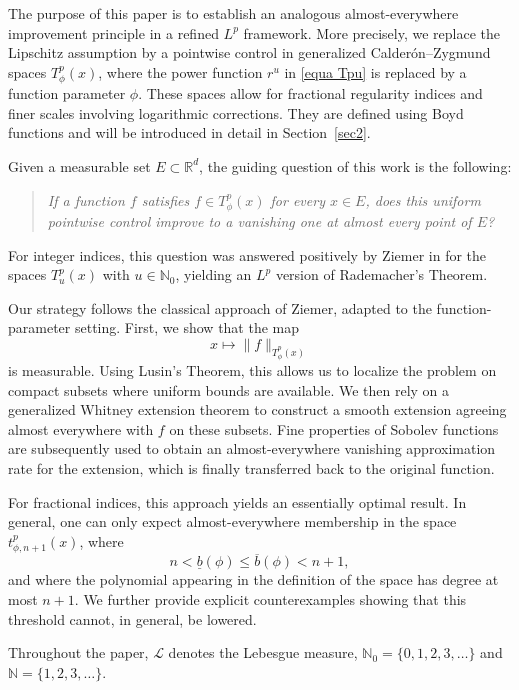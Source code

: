 \documentclass[a4paper,10pt]{article}
\theoremstyle{thmstyleone}%
\theoremstyle{thmstyletwo}%
\theoremstyle{thmstylethree}%
\begin{document}
\medskip

The purpose of this paper is to establish an analogous almost-everywhere improvement principle in a refined $L^p$ framework. More precisely, we replace the Lipschitz assumption by a pointwise control in generalized Calder\'on--Zygmund spaces $T^p_\phi(x)$, where the power function $r^u$ in \eqref{equa Tpu} is replaced by a function parameter $\phi$. These spaces allow for fractional regularity indices and finer scales involving logarithmic corrections. They are defined using Boyd functions and will be introduced in detail in Section~\ref{sec2}.

Given a measurable set $E \subset \mathbb{R}^d$, the guiding question of this work is the following:
\begin{quote}
\emph{If a function $f$ satisfies $f \in T^p_\phi(x)$ for every $x \in E$, does this uniform pointwise control improve to a vanishing one at almost every point of $E$?}
\end{quote}
For integer indices, this question was answered positively by Ziemer in \cite{Ziemer:89} for the spaces $T^p_u(x)$ with $u \in \mathbb{N}_0$, yielding an $L^p$ version of Rademacher's Theorem.

\medskip

Our strategy follows the classical approach of Ziemer, adapted to the function-parameter setting. First, we show that the map
\[
x \longmapsto \|f\|_{T^p_\phi(x)}
\]
is measurable. Using Lusin's Theorem, this allows us to localize the problem on compact subsets where uniform bounds are available. We then rely on a generalized Whitney extension theorem to construct a smooth extension agreeing almost everywhere with $f$ on these subsets. Fine properties of Sobolev functions are subsequently used to obtain an almost-everywhere vanishing approximation rate for the extension, which is finally transferred back to the original function. 

For fractional indices, this approach yields an essentially optimal result. In general, one can only expect almost-everywhere membership in the space $t^p_{\phi,n+1}(x)$, where
\[
n < \underline{b}(\phi) \leq \overline{b}(\phi) < n+1,
\]
and where the polynomial appearing in the definition of the space has degree at most $n+1$. We further provide explicit counterexamples showing that this threshold cannot, in general, be lowered.


\medskip

Throughout the paper, $\mathcal{L}$ denotes the Lebesgue measure, $\mathbb{N}_0=\{0,1,2,3,\dots\}$ and $\mathbb{N}=\{1,2,3,\dots\}$.
\end{document}

